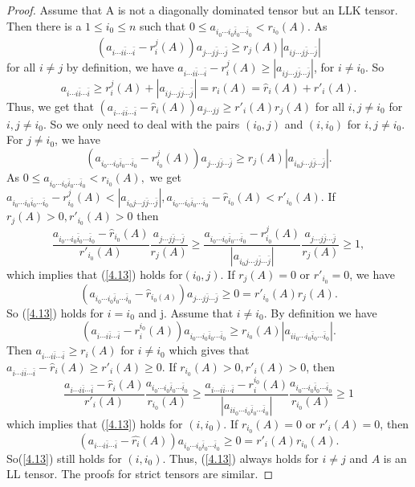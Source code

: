 \documentclass[10pt,a4paper]{amsart}
\begin{document}
\begin{proof}
Assume that A is not a diagonally dominated tensor but an LLK tensor. Then there is a $1\leq i_{0}\leq n$ such that
$0\leq a_{i_{0}\cdots i_{0}\bar{i}_0\cdots \bar{i}_0}<r_{i_{0}}(A).$
As $$(a_{i\cdots i\bar{i}\cdots\bar{i}}-r_{i}^{j}(A))a_{j\cdots j\bar{j}\cdots\bar{j}}\geq r_{j}(A)|a_{ij\cdots j\bar{j}\cdots \bar{j}}|$$ for all $i\neq j$ by definition, we have
$a_{i\cdots i\bar{i}\cdots\bar{i}}-r_{i}^{j}(A)\geq |a_{ij\cdots j\bar{j}\cdots \bar{j}}|$, for $i\neq i_0$. So $$a_{i\cdots i\bar{i}\cdots\bar{i}}\geq r_{i}^{j}(A)+|a_{ij\cdots j\bar{j}\cdots \bar{j}}|=r_{i}(A)=\hat{r}_{i}(A)+r'_{i}(A).$$ 
Thus, we get that $(a_{i\cdots i\bar{i}\cdots\bar{i}}-\hat{r}_{i}(A))a_{j\cdots jj}\geq r'_{i}(A)r_{j}(A)$ for all $i,j\neq i_{0}$ for $i, j\neq i_0$. So we only need to deal with the pairs $(i_0, j)$ and $(i, i_0)$ for $i, j\neq i_0$.
For $j\neq i_{0}$, we have
$$(a_{i_{0}\cdots i_{0}\bar{i}_0\cdots \bar{i}_0}-r_{i_{0}}^{j}(A))a_{j\cdots j\bar{j}\cdots \bar{j}}\geq r_{j}(A)|a_{i_{0}j\cdots j\bar{j}\cdots \bar{j}}|. $$
As $0\leq a_{i_{0}\cdots i_{0}\bar{i}_0\cdots \bar{i}_0}<r_{i_{0}}(A),$ we get $a_{i_{0}\cdots i_{0}\bar{i}_0\cdots \bar{i}_0}-r_{i_{0}}^{j}(A)<|a_{i_{0}j\cdots j\bar{j}\cdots \bar{j}}|, a_{i_{0}\cdots i_{0}\bar{i}_0\cdots \bar{i}_0}-\hat{r}_{i_{0}}(A)<r'_{i_{0}}(A).$ If $r_{j}(A)>0,r'_{i_{0}}(A)>0$ then
$$\dfrac{a_{i_{0}\cdots i_{0}\bar{i}_0\cdots \bar{i}_0}-\hat{r}_{i_{0}}(A)}{r'_{i_0}(A)}\dfrac{a_{j\cdots j\bar{j}\cdots \bar{j}}}{r_{j}(A)}\geq \dfrac{a_{i_{0}\cdots i_{0}\bar{i}_0\cdots \bar{i}_0}-r_{i_{0}}^{j}(A)}{|a_{i_{0}j\cdots j\bar{j}\cdots \bar{j}}|}\dfrac{a_{j\cdots j\bar{j}\cdots \bar{j}}}{r_{j}(A)}\geq 1,$$
which implies that (\ref{4.13}) holds for$(i_0, j)$. If $r_{j}(A)=0$ or $r'_{i_{0}}=0$, we have
$$(a_{i_{0}\cdots i_{0}\bar{i}_0\cdots \bar{i}_0}-\hat{r}_{i_{0}(A)})a_{j\cdots j\bar{j}\cdots \bar{j}}\geq 0=r'_{i_{0}}(A)r_{j}(A).$$
So (\ref{4.13}) holds for $i=i_{0}$ and j.
Assume that $i\neq i_{0}.$ By definition we have 
$$(a_{i\cdots i\bar{i}\cdots \bar{i}}-r_{i}^{i_0}(A))a_{i_0\cdots i_0\bar{i}_0\cdots\bar{i}_0}\geq r_{i_0}(A)|a_{ii_0\cdots i_0\bar{i}_0\cdots\bar{i}_0}|.$$
Then $a_{i\cdots i\bar{i}\cdots\bar{i}}\geq r_{i}(A)$ for $i\neq i_{0}$ which gives that $a_{i\cdots i\bar{i}\cdots\bar{i}}-\hat{r}_{i}(A)\geq r'_{i}(A)\geq0.$ If $r_{i_0}(A)>0,r'_{i}(A)>0$, then
$$\dfrac{a_{i\cdots i\bar{i}\cdots\bar{i}}-\hat{r}_{i}(A)}{r'_{i}(A)}\dfrac{a_{i_{0}\cdots i_{0}\bar{i}_0\cdots \bar{i}_0}}{r_{i_{0}}(A)}\geq \frac{a_{i\cdots i\bar{i}\cdots \bar{i}}-r_{i}^{i_0}(A)}{|a_{ii_0\cdots i_0\bar{i}_0\cdots\bar{i}_0}|}\frac{a_{i_0\cdots i_0\bar{i}_0\cdots \bar{i}_0}}{r_{i_0}(A)}\geq 1$$
which implies that (\ref{4.13}) holds for $(i, i_{0}).$ If $r_{i_0}(A)=0$ or $r'_i(A)=0$, then 
$$(a_{i\cdots i\bar{i}\cdots\bar{i}}-\hat{r_{i}}(A))a_{i_{0}\cdots i_{0}\bar{i}_0\cdots \bar{i}_0}\geq0=r'_{i}(A)r_{i_{0}}(A).$$
So(\ref{4.13}) still holds for $(i, i_{0})$. 
Thus, (\ref{4.13}) always holds for $i\neq j$ and $A$ is an LL tensor.
The proofs for strict tensors are similar. 
\end{proof}	
\end{document}
